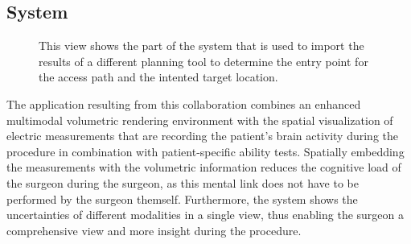 \subsection{System} \label{contributions:dbs:system}
\begin{figure}
\caption{This view shows the part of the system that is used to import the results of a different planning tool to determine the entry point for the access path and the intented target location.}
\label{contributions:dbs:planning}
\end{figure}





The application resulting from this collaboration combines an enhanced multimodal  volumetric rendering environment with the spatial visualization of electric measurements that are recording the patient's brain activity during the procedure in combination with patient-specific ability tests.  Spatially embedding the measurements with the volumetric information reduces the cognitive load of the surgeon during the surgeon, as this mental link does not have to be performed by the surgeon themself.  Furthermore, the system shows the uncertainties of different modalities in a single view, thus enabling the surgeon a comprehensive view and more insight during the procedure.


